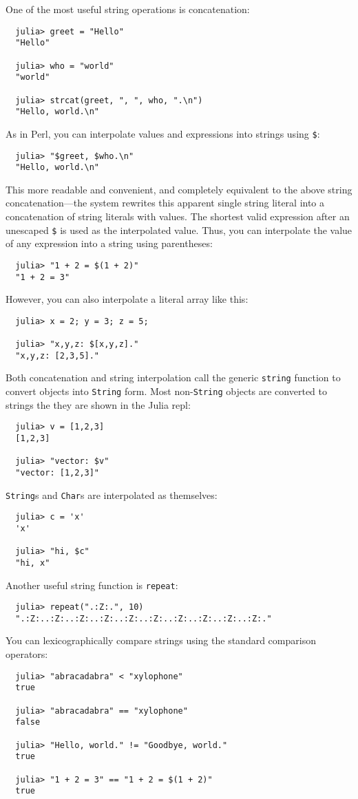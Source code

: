 \documentclass{article}
\begin{document}
One of the most useful string operations is concatenation:
\begin{verbatim}
  julia> greet = "Hello"
  "Hello"

  julia> who = "world"
  "world"

  julia> strcat(greet, ", ", who, ".\n")
  "Hello, world.\n"
\end{verbatim}
As in Perl, you can interpolate values and expressions into strings using \verb|$|:
\begin{verbatim}
  julia> "$greet, $who.\n"
  "Hello, world.\n"
\end{verbatim}
This more readable and convenient, and completely equivalent to the above string concatenation---the system rewrites this apparent single string literal into a concatenation of string literals with values.
The shortest valid expression after an unescaped \verb|$| is used as the interpolated value.
Thus, you can interpolate the value of any expression into a string using parentheses:
\begin{verbatim}
  julia> "1 + 2 = $(1 + 2)"
  "1 + 2 = 3"
\end{verbatim}
However, you can also interpolate a literal array like this:
\begin{verbatim}
  julia> x = 2; y = 3; z = 5;

  julia> "x,y,z: $[x,y,z]."
  "x,y,z: [2,3,5]."
\end{verbatim}
Both concatenation and string interpolation call the generic \verb|string| function to convert objects into \verb|String| form.
Most non-\verb|String| objects are converted to strings the they are shown in the Julia repl:
\begin{verbatim}
  julia> v = [1,2,3]
  [1,2,3]

  julia> "vector: $v"
  "vector: [1,2,3]"
\end{verbatim}
\verb|String|s and \verb|Char|s are interpolated as themselves:
\begin{verbatim}
  julia> c = 'x'
  'x'

  julia> "hi, $c"
  "hi, x"
\end{verbatim}
Another useful string function is \verb|repeat|:
\begin{verbatim}
  julia> repeat(".:Z:.", 10)
  ".:Z:..:Z:..:Z:..:Z:..:Z:..:Z:..:Z:..:Z:..:Z:..:Z:."
\end{verbatim}
You can lexicographically compare strings using the standard comparison operators:
\begin{verbatim}
  julia> "abracadabra" < "xylophone"
  true

  julia> "abracadabra" == "xylophone"
  false

  julia> "Hello, world." != "Goodbye, world."
  true

  julia> "1 + 2 = 3" == "1 + 2 = $(1 + 2)"
  true
\end{verbatim}
\end{document}

